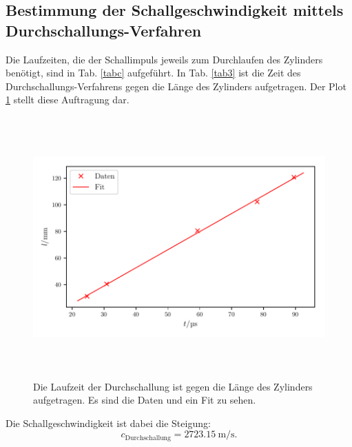 \subsection{Bestimmung der Schallgeschwindigkeit mittels Durchschallungs-Verfahren}
Die Laufzeiten, die der Schallimpuls jeweils zum Durchlaufen des Zylinders benötigt,
sind in Tab. \ref{tabc} aufgeführt. In Tab. \ref{tab3} ist die Zeit des
Durchschallungs-Verfahrens gegen die Länge des Zylinders aufgetragen.
Der Plot \ref{fig:plot3} stellt diese Auftragung dar.


\begin{figure}
    \centering
    \includegraphics[width=15cm, height=10cm]{build/plot3.pdf}
    \caption{Die Laufzeit der Durchschallung ist gegen die Länge des Zylinders
    aufgetragen. Es sind die Daten und ein Fit zu sehen.}
    \label{fig:plot3}
\end{figure}
\noindent Die Schallgeschwindigkeit ist dabei die Steigung:
\begin{equation*}
    c_{\text{Durchschallung}} = \SI{2723.15}{\meter\per\second}.
\end{equation*}

